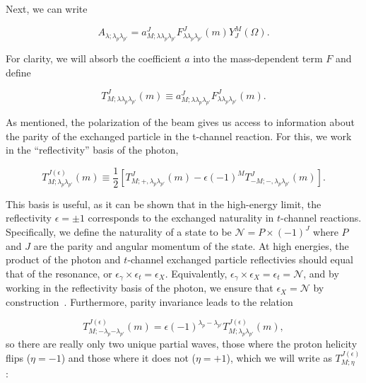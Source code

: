 Next, we can write

\begin{equation}
  A_{\lambda;\lambda_p\lambda_{p'}} = a^J_{M;\lambda\lambda_p\lambda_{p'}} F^J_{\lambda\lambda_p\lambda_{p'}}(m) Y_J^M(\Omega).
\end{equation}

For clarity, we will absorb the coefficient $a$ into the mass-dependent term $F$ and define

\begin{equation}
  T^{J}_{M;\lambda\lambda_p\lambda_{p'}}(m) \equiv a^J_{M;\lambda\lambda_p\lambda_{p'}} F^J_{\lambda\lambda_p\lambda_{p'}}(m).
  \label{eq:amplitude-definition}
\end{equation}

As mentioned, the polarization of the beam gives us access to information about the parity of the exchanged particle in the t-channel reaction. For this, we work in the ``reflectivity'' basis of the photon,

\begin{equation}
  T^{J(\epsilon)}_{M;\lambda_p\lambda_{p'}}(m) \equiv \frac{1}{2} \left[T^J_{M;+,\lambda_p\lambda_{p'}}(m) - \epsilon(-1)^M T^J_{-M;-,\lambda_p\lambda_{p'}}(m)\right].
  \label{eq:reflectivity-amplitude}
\end{equation}

This basis is useful, as it can be shown that in the high-energy limit, the reflectivity $\epsilon=\pm 1$ corresponds to the exchanged naturality in $t$-channel reactions. Specifically, we define the naturality of a state to be $\mathcal{N} = P \times (-1)^{J}$ where $P$ and $J$ are the parity and angular momentum of the state. At high energies, the product of the photon and $t$-channel exchanged particle reflectivies should equal that of the resonance, or $\epsilon_{\gamma} \times \epsilon_{t} = \epsilon_{X}$. Equivalently, $\epsilon_{\gamma} \times \epsilon_{X} = \epsilon_{t} = \mathcal{N}$, and by working in the reflectivity basis of the photon, we ensure that $\epsilon_{X} = \mathcal{N}$ by construction~\cite{Salgado2023}. Furthermore, parity invariance leads to the relation

\begin{equation}
  T^{J(\epsilon)}_{M;-\lambda_p{-\lambda_{p'}}}(m) = \epsilon(-1)^{\lambda_p-\lambda_{p'}}T^{J(\epsilon)}_{M;\lambda_p\lambda_{p'}}(m),
  \label{eq:nucleon-parity-invariance}
\end{equation}
so there are really only two unique partial waves, those where the proton helicity flips ($\eta = -1$) and those where it does not ($\eta = +1$), which we will write as $T^{J(\epsilon)}_{M;\eta}$:

